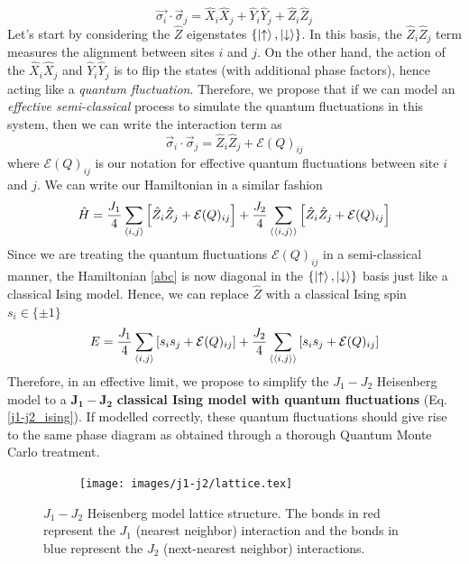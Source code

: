 \documentclass[../journal_main.tex]{subfiles}
\begin{document}
\begin{equation}
    \vec{\sigma_i} \cdot \vec{\sigma}_j = \hat{X}_i \hat{X}_j + \hat{Y}_i \hat{Y}_j + \hat{Z}_i \hat{Z}_j
\end{equation}
Let's start by considering the $\hat{Z}$ eigenstates $\{\ket{\uparrow}, \ket{\downarrow}\}$. In this basis, the $\hat{Z}_i \hat{Z}_j$ term measures the alignment between sites $i$ and $j$. On the other hand, the action of the $\hat{X}_i \hat{X}_j$ and $\hat{Y}_i \hat{Y}_j$ is to flip the states (with additional phase factors), hence acting like a \textit{quantum fluctuation}. Therefore, we propose that if we can model an \textit{effective semi-classical} process to simulate the quantum fluctuations in this system, then we can write the interaction term as 
\begin{equation}
    \vec{\sigma}_i \cdot \vec{\sigma}_j = \hat{Z}_i \hat{Z}_j + \mathcal{E}(Q)_{ij}
\end{equation}
where $\mathcal{E}(Q)_{ij}$ is our notation for effective quantum fluctuations between site $i$ and $j$. We can write our Hamiltonian in a similar fashion
\begin{equation}
    \hat{H} = \frac{J_1}{4} \sum_{\expval{i,j}} \qty[\hat{Z}_i \hat{Z}_j + \mathcal{E}(Q)_{ij}] + \frac{J_2}{4} \sum_{\expval{\expval{i,j}}} \qty[\hat{Z}_i \hat{Z}_j + \mathcal{E}(Q)_{ij}]
    \label{abc}
\end{equation}
Since we are treating the quantum fluctuations $\mathcal{E}(Q)_{ij}$ in a semi-classical manner, the Hamiltonian \eqref{abc} is now diagonal in the $\{\ket{\uparrow}, \ket{\downarrow} \}$ basis just like a classical Ising model. Hence, we can replace $\hat{Z}$ with a classical Ising spin $s_i \in \{\pm 1\}$  
\begin{equation}
    E = \frac{J_1}{4} \sum_{\expval{i,j}} \qty[s_i s_j + \mathcal{E}(Q)_{ij}] + \frac{J_2}{4} \sum_{\expval{\expval{i,j}}} \qty[s_i s_j + \mathcal{E}(Q)_{ij}]
    \label{j1-j2_ising}
\end{equation}
Therefore, in an effective limit, we propose to simplify the $J_1 - J_2$ Heisenberg model to a $\boldsymbol{J_1 - J_2}$ \textbf{classical Ising model with quantum fluctuations} (Eq. \eqref{j1-j2_ising}). If modelled correctly, these quantum fluctuations should give rise to the same phase diagram as obtained through a thorough Quantum Monte Carlo treatment.
\begin{figure}[t!]
    \centering
    \begin{subfigure}[b]{0.7\textwidth}  %
        \centering
        \texttt{[image: images/j1-j2/lattice.tex]}
    \end{subfigure}
    \caption{ $J_1-J_2$ Heisenberg model lattice structure. The bonds in red represent the $J_1$ (nearest neighbor) interaction and the bonds in blue represent the $J_2$ (next-nearest neighbor) interactions.}
    \label{lattice}
\end{figure}
\end{document}
